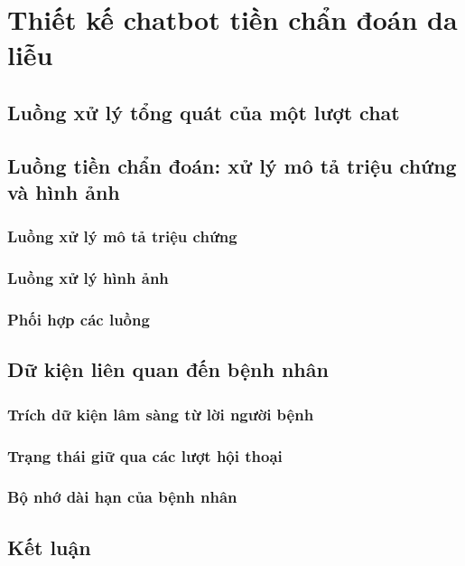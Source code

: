 \chapter[\MakeUppercase{Thiết kế chatbot tiền chẩn đoán da liễu}]{Thiết kế chatbot tiền chẩn đoán da liễu}
\label{ch:chuong5}


\section{Luồng xử lý tổng quát của một lượt chat}

\section{Luồng tiền chẩn đoán: xử lý mô tả triệu chứng và hình ảnh}

\subsection{Luồng xử lý mô tả triệu chứng}

\subsection{Luồng xử lý hình ảnh}

\subsection{Phối hợp các luồng}

\section{Dữ kiện liên quan đến bệnh nhân}

\subsection{Trích dữ kiện lâm sàng từ lời người bệnh}

\subsection{Trạng thái giữ qua các lượt hội thoại}

\subsection{Bộ nhớ dài hạn của bệnh nhân}

\section{Kết luận}

